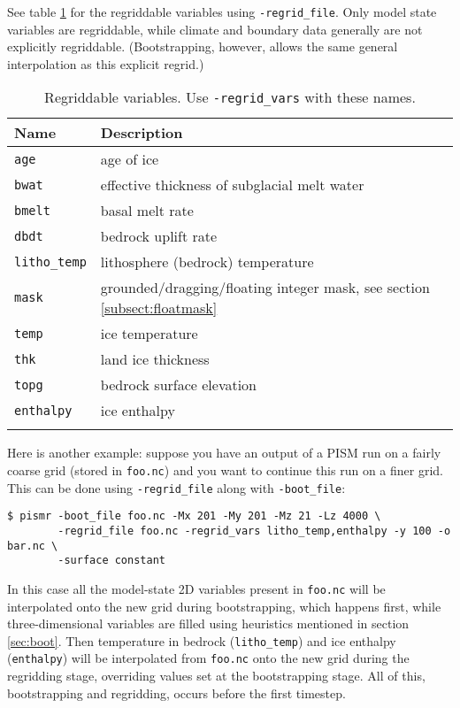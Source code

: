 See table \ref{tab:regridvar} for the regriddable variables using
\texttt{-regrid_file}.  Only model state variables are regriddable, while climate and boundary data generally are not explicitly regriddable.  (Bootstrapping, however, allows the same general interpolation as this explicit regrid.)

\begin{table}[ht]
  \centering
  \begin{tabular}{ll}\toprule
    \textbf{Name} & \textbf{Description}\\ \midrule
    \texttt{age} & age of ice\\
    \texttt{bwat} & effective thickness of subglacial melt water \\
    \texttt{bmelt} & basal melt rate \\
    \texttt{dbdt} & bedrock uplift rate \\
    \texttt{litho_temp} & lithosphere (bedrock) temperature \\
    \texttt{mask} & grounded/dragging/floating integer mask, see section \ref{subsect:floatmask} \\
    \texttt{temp} & ice temperature \\
    \texttt{thk} & land ice thickness \\
    \texttt{topg} & bedrock surface elevation \\
    \texttt{enthalpy} & ice enthalpy\\
    \bottomrule
    \normalsize
  \end{tabular}
\caption{Regriddable variables.  Use \texttt{-regrid_vars} with these names.}
\label{tab:regridvar}
\end{table}

Here is another example: suppose you have an output of a PISM run on a fairly
coarse grid (stored in \texttt{foo.nc}) and you want to continue this run on a
finer grid. This can be done using \texttt{-regrid_file} along with
\texttt{-boot_file}:
\begin{verbatim}
$ pismr -boot_file foo.nc -Mx 201 -My 201 -Mz 21 -Lz 4000 \
        -regrid_file foo.nc -regrid_vars litho_temp,enthalpy -y 100 -o bar.nc \
        -surface constant
\end{verbatim}
In this case all the model-state 2D variables present in \texttt{foo.nc} will
be interpolated onto the new grid during bootstrapping, which happens first,
while three-dimensional variables are filled using heuristics mentioned in
section \ref{sec:boot}.  Then temperature in bedrock (\texttt{litho_temp}) and
ice enthalpy (\texttt{enthalpy}) will be interpolated from \texttt{foo.nc} onto the
new grid during the regridding stage, overriding values set at the
bootstrapping stage.  All of this, bootstrapping and regridding, occurs before
the first timestep.


